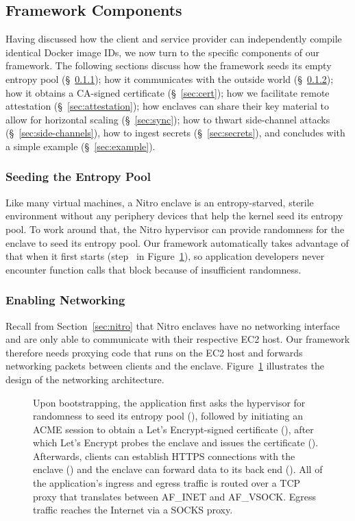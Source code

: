 \subsection{Framework Components}
\label{sec:framework}

Having discussed how the client and service provider can independently compile
identical Docker image IDs, we now turn to the specific components of our
framework.  The following sections discuss how the framework
seeds its empty entropy pool (\S~\ref{sec:entropy});
how it communicates with the outside world (\S~\ref{sec:networking});
how it obtains a CA-signed certificate (\S~\ref{sec:cert});
how we facilitate remote attestation (\S~\ref{sec:attestation});
how enclaves can share their key material to allow for horizontal scaling (\S~\ref{sec:sync});
how to thwart side-channel attacks (\S~\ref{sec:side-channels}),
how to ingest secrets (\S~\ref{sec:secrets}), and
concludes with a simple example (\S~\ref{sec:example}).

\subsubsection{Seeding the Entropy Pool}
\label{sec:entropy}

Like many virtual machines, a Nitro enclave is an entropy-starved, sterile
environment without any periphery devices that help the kernel seed its entropy
pool.  To work around that, the Nitro hypervisor can provide randomness for the
enclave to seed its entropy pool.  Our framework automatically takes advantage
of that when it first starts (step~ in Figure~\ref{fig:networking}),
so application developers never encounter function calls that block because of
insufficient randomness.

\subsubsection{Enabling Networking}
\label{sec:networking}

Recall from Section~\ref{sec:nitro} that Nitro enclaves have no networking
interface and are only able to communicate with their respective EC2 host.  Our
framework therefore needs proxying code that runs on the EC2 host and forwards
networking packets between clients and the enclave.  Figure~\ref{fig:networking}
illustrates the design of the networking architecture.

\begin{figure}[t]
\centering

\caption{Upon bootstrapping, the application first asks the hypervisor for
  randomness to seed its entropy pool (), followed by initiating an
  ACME session to obtain a Let's Encrypt-signed certificate (), after
  which Let's Encrypt probes the enclave and issues the certificate
  ().  Afterwards, clients can establish HTTPS connections with the
  enclave () and the enclave can forward data to its back end
  ().  All of the application's ingress and egress  traffic is routed
  over a TCP proxy that translates between AF\_INET and AF\_VSOCK.  Egress
  traffic reaches the Internet via a SOCKS proxy.}
\label{fig:networking}
\end{figure}

